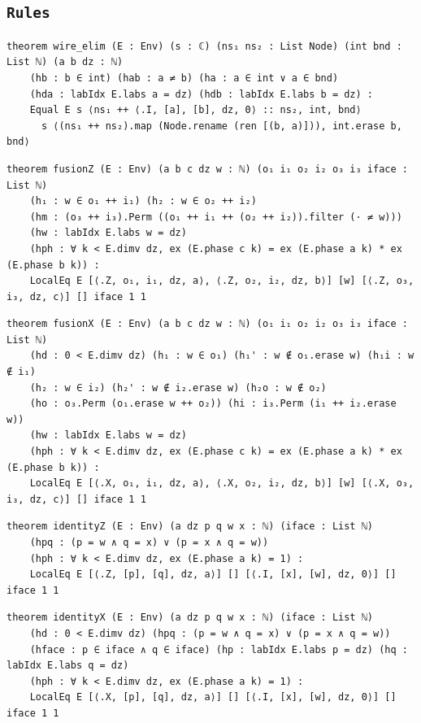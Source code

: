\subsection{\texttt{Rules}}
\begin{lstlisting}[style=leancore]
theorem wire_elim (E : Env) (s : ℂ) (ns₁ ns₂ : List Node) (int bnd : List ℕ) (a b dz : ℕ)
    (hb : b ∈ int) (hab : a ≠ b) (ha : a ∈ int ∨ a ∈ bnd)
    (hda : labIdx E.labs a = dz) (hdb : labIdx E.labs b = dz) :
    Equal E s ⟨ns₁ ++ ⟨.I, [a], [b], dz, 0⟩ :: ns₂, int, bnd⟩
      s ⟨(ns₁ ++ ns₂).map (Node.rename (ren [(b, a)])), int.erase b, bnd⟩
\end{lstlisting}
\begin{lstlisting}[style=leancore]
theorem fusionZ (E : Env) (a b c dz w : ℕ) (o₁ i₁ o₂ i₂ o₃ i₃ iface : List ℕ)
    (h₁ : w ∈ o₁ ++ i₁) (h₂ : w ∈ o₂ ++ i₂)
    (hm : (o₃ ++ i₃).Perm ((o₁ ++ i₁ ++ (o₂ ++ i₂)).filter (· ≠ w)))
    (hw : labIdx E.labs w = dz)
    (hph : ∀ k < E.dimv dz, ex (E.phase c k) = ex (E.phase a k) * ex (E.phase b k)) :
    LocalEq E [⟨.Z, o₁, i₁, dz, a⟩, ⟨.Z, o₂, i₂, dz, b⟩] [w] [⟨.Z, o₃, i₃, dz, c⟩] [] iface 1 1
\end{lstlisting}
\begin{lstlisting}[style=leancore]
theorem fusionX (E : Env) (a b c dz w : ℕ) (o₁ i₁ o₂ i₂ o₃ i₃ iface : List ℕ)
    (hd : 0 < E.dimv dz) (h₁ : w ∈ o₁) (h₁' : w ∉ o₁.erase w) (h₁i : w ∉ i₁)
    (h₂ : w ∈ i₂) (h₂' : w ∉ i₂.erase w) (h₂o : w ∉ o₂)
    (ho : o₃.Perm (o₁.erase w ++ o₂)) (hi : i₃.Perm (i₁ ++ i₂.erase w))
    (hw : labIdx E.labs w = dz)
    (hph : ∀ k < E.dimv dz, ex (E.phase c k) = ex (E.phase a k) * ex (E.phase b k)) :
    LocalEq E [⟨.X, o₁, i₁, dz, a⟩, ⟨.X, o₂, i₂, dz, b⟩] [w] [⟨.X, o₃, i₃, dz, c⟩] [] iface 1 1
\end{lstlisting}
\begin{lstlisting}[style=leancore]
theorem identityZ (E : Env) (a dz p q w x : ℕ) (iface : List ℕ)
    (hpq : (p = w ∧ q = x) ∨ (p = x ∧ q = w))
    (hph : ∀ k < E.dimv dz, ex (E.phase a k) = 1) :
    LocalEq E [⟨.Z, [p], [q], dz, a⟩] [] [⟨.I, [x], [w], dz, 0⟩] [] iface 1 1
\end{lstlisting}
\begin{lstlisting}[style=leancore]
theorem identityX (E : Env) (a dz p q w x : ℕ) (iface : List ℕ)
    (hd : 0 < E.dimv dz) (hpq : (p = w ∧ q = x) ∨ (p = x ∧ q = w))
    (hface : p ∈ iface ∧ q ∈ iface) (hp : labIdx E.labs p = dz) (hq : labIdx E.labs q = dz)
    (hph : ∀ k < E.dimv dz, ex (E.phase a k) = 1) :
    LocalEq E [⟨.X, [p], [q], dz, a⟩] [] [⟨.I, [x], [w], dz, 0⟩] [] iface 1 1
\end{lstlisting}

